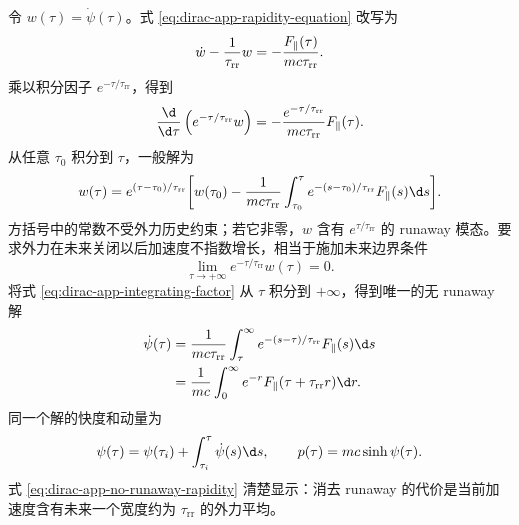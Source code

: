 令 $w(\tau)=\dot\psi(\tau)$。式 \eqref{eq:dirac-app-rapidity-equation} 改写为
\begin{equation*}
 \dot w-{1\over\tau_{\mathrm{rr}}}w
 =-{F_\parallel(\tau)\over mc\tau_{\mathrm{rr}}}.
\end{equation*}
乘以积分因子 $e^{-\tau/\tau_{\mathrm{rr}}}$，得到
\begin{equation}
 {\d\over\d\tau}
 \left(e^{-\tau/\tau_{\mathrm{rr}}}w\right)
 =-{e^{-\tau/\tau_{\mathrm{rr}}}\over mc\tau_{\mathrm{rr}}}
 F_\parallel(\tau).
 \label{eq:dirac-app-integrating-factor}
\end{equation}
从任意 $\tau_0$ 积分到 $\tau$，一般解为
\begin{align}
 w(\tau)
 =e^{(\tau-\tau_0)/\tau_{\mathrm{rr}}}
 \bigg[
 w(\tau_0)
 -{1\over mc\tau_{\mathrm{rr}}}
 \int_{\tau_0}^{\tau}
 e^{-(s-\tau_0)/\tau_{\mathrm{rr}}}F_\parallel(s)\d s
 \bigg].
 \label{eq:dirac-app-general-rapidity-rate}
\end{align}
方括号中的常数不受外力历史约束；若它非零，$w$ 含有 $e^{\tau/\tau_{\mathrm{rr}}}$ 的 runaway 模态。要求外力在未来关闭以后加速度不指数增长，相当于施加未来边界条件
\begin{equation*}
 \lim_{\tau\to+\infty}
 e^{-\tau/\tau_{\mathrm{rr}}}w(\tau)=0.
\end{equation*}
将式 \eqref{eq:dirac-app-integrating-factor} 从 $\tau$ 积分到 $+\infty$，得到唯一的无 runaway 解
\begin{align}
 \dot\psi(\tau)
 &={1\over mc\tau_{\mathrm{rr}}}
 \int_{\tau}^{\infty}
 e^{-(s-\tau)/\tau_{\mathrm{rr}}}F_\parallel(s)\d s
 \notag\\
 &={1\over mc}
 \int_0^\infty e^{-r}
 F_\parallel(\tau+\tau_{\mathrm{rr}}r)\d r.
 \label{eq:dirac-app-no-runaway-rapidity}
\end{align}
同一个解的快度和动量为
\begin{equation}
 \psi(\tau)=\psi(\tau_i)+\int_{\tau_i}^{\tau}\dot\psi(s)\d s,
 \qquad
 p(\tau)=mc\sinh\psi(\tau).
 \label{eq:dirac-app-rapidity-momentum-solution}
\end{equation}
式 \eqref{eq:dirac-app-no-runaway-rapidity} 清楚显示：消去 runaway 的代价是当前加速度含有未来一个宽度约为 $\tau_{\mathrm{rr}}$ 的外力平均。


